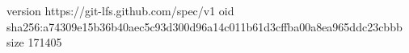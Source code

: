 version https://git-lfs.github.com/spec/v1
oid sha256:a74309e15b36b40aec5c93d300d96a14c011b61d3cffba00a8ea965ddc23cbbb
size 171405
